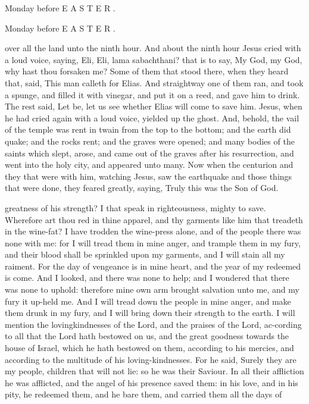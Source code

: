 Monday before E A S T E R .

Monday before E A S T E R .

over all the land unto the ninth hour. And about the ninth hour Jesus cried with a loud voice, saying, Eli, Eli, lama sabachthani? that is to say, My God, my God, why hast thou forsaken me? Some of them that stood there, when they heard that, said, This man calleth for Elias. And straightway one of them ran, and took a spunge, and filled it with vinegar, and put it on a reed, and gave him to drink. The rest said, Let be, let us see whether Elias will come to save him. Jesus, when he had cried again with a loud voice, yielded up the ghost. And, behold, the vail of the temple was rent in twain from the top to the bottom; and the earth did quake; and the rocks rent; and the graves were opened; and many bodies of the saints which slept, arose, and came out of the graves after his resurrection, and went into the holy city, and appeared unto many. Now when the centurion and they that were with him, watching Jesus, saw the earthquake and those things that were done, they feared greatly, saying, Truly this was the Son of God.

greatness of his strength? I that speak in righteousness, mighty to save. Wherefore art thou red in thine apparel, and thy garments like him that treadeth in the wine-fat? I have trodden the wine-press alone, and of the people there was none with me: for I will tread them in mine anger, and trample them in my fury, and their blood shall be sprinkled upon my garments, and I will stain all my raiment. For the day of vengeance is in mine heart, and the year of my redeemed is come. And I looked, and there was none to help; and I wondered that there was none to uphold: therefore mine own arm brought salvation unto me, and my fury it up-held me. And I will tread down the people in mine anger, and make them drunk in my fury, and I will bring down their strength to the earth. I will mention the lovingkindnesses of the Lord, and the praises of the Lord, ac-cording to all that the Lord hath bestowed on us, and the great goodness towards the house of Israel, which he hath bestowed on them, according to his mercies, and according to the multitude of his loving-kindnesses. For he said, Surely they are my people, children that will not lie: so he was their Saviour. In all their affliction he was afflicted, and the angel of his presence saved them: in his love, and in his pity, he redeemed them, and he bare them, and carried them all the days of

